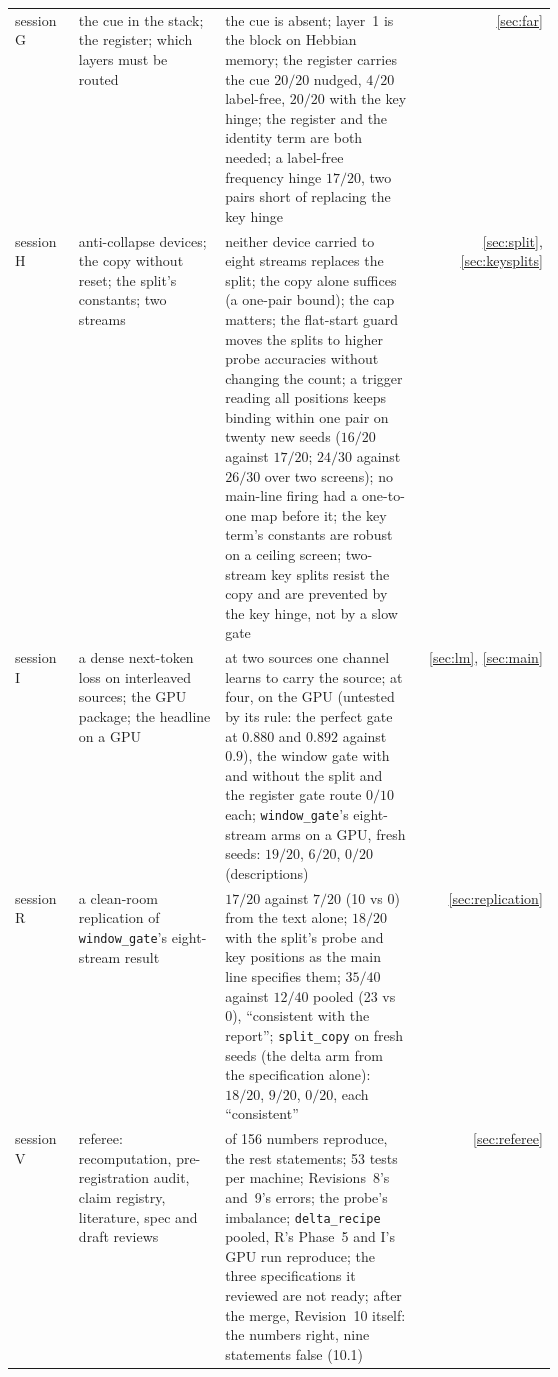 \documentclass[11pt]{article}
\begin{document}
{\begin{longtable}{@{}l>{\raggedright\arraybackslash}p{0.27\linewidth}>{\raggedright\arraybackslash}p{0.36\linewidth}r@{}}
session G & the cue in the stack; the register; which layers must be routed & the cue is absent; layer~1 is the block on Hebbian memory; the register carries the cue $20/20$ nudged, $4/20$ label-free, $20/20$ with the key hinge; the register and the identity term are both needed; a label-free frequency hinge $17/20$, two pairs short of replacing the key hinge & \ref{sec:far}\\
session H & anti-collapse devices; the copy without reset; the split's constants; two streams & neither device carried to eight streams replaces the split; the copy alone suffices (a one-pair bound); the cap matters; the flat-start guard moves the splits to higher probe accuracies without changing the count; a trigger reading all positions keeps binding within one pair on twenty new seeds ($16/20$ against $17/20$; $24/30$ against $26/30$ over two screens); no main-line firing had a one-to-one map before it; the key term's constants are robust on a ceiling screen; two-stream key splits resist the copy and are prevented by the key hinge, not by a slow gate & \ref{sec:split}, \ref{sec:keysplits}\\
session I & a dense next-token loss on interleaved sources; the GPU package; the headline on a GPU & at two sources one channel learns to carry the source; at four, on the GPU (untested by its rule: the perfect gate at $0.880$ and $0.892$ against $0.9$), the window gate with and without the split and the register gate route $0/10$ each; \texttt{window\_gate}'s eight-stream arms on a GPU, fresh seeds: $19/20$, $6/20$, $0/20$ (descriptions) & \ref{sec:lm}, \ref{sec:main}\\
session R & a clean-room replication of \texttt{window\_gate}'s eight-stream result & $17/20$ against $7/20$ (10 vs 0) from the text alone; $18/20$ with the split's probe and key positions as the main line specifies them; $35/40$ against $12/40$ pooled (23 vs 0), ``consistent with the report''; \texttt{split\_copy} on fresh seeds (the delta arm from the specification alone): $18/20$, $9/20$, $0/20$, each ``consistent'' & \ref{sec:replication}\\
session V & referee: recomputation, pre-registration audit, claim registry, literature, spec and draft reviews & 140 of 156 numbers reproduce, the rest statements; 53 tests per machine; Revisions~8's and~9's errors; the probe's imbalance; \texttt{delta\_recipe} pooled, R's Phase~5 and I's GPU run reproduce; the three specifications it reviewed are not ready; after the merge, Revision~10 itself: the numbers right, nine statements false (10.1) & \ref{sec:referee}\\

\end{longtable}}
\end{document}
